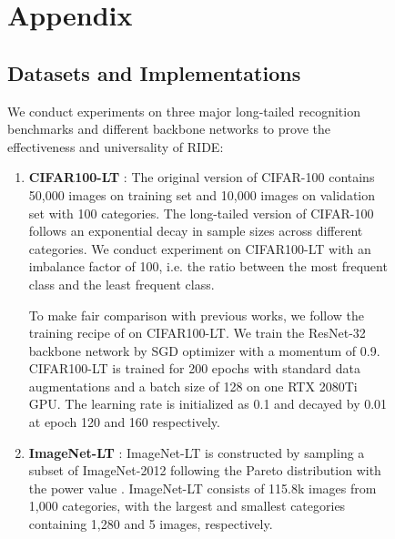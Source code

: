 \documentclass[dvipsnames]{article}
\begin{document}
{\begin{figure}[#1]
\def\figBranchesEnsembles#1{
\begin{figure}[#1]
    \begin{minipage}[t]{0.5\textwidth}
        \vspace{0pt}
        \texttt{[image: figures/branches\_ensembles.pdf]}\vspace{-4pt}
    \end{minipage}\hfill
    \begin{minipage}[t]{0.48\textwidth}
        \vspace{20pt}
        \caption{Comparison between our method and multiple LDAM models ensembled together. In the figure, ensembles of LDAM start from 1 ensemble (original LDAM) to 7 ensembles, and RIDE starts from 2 experts to 4 experts. Our method achieves higher accuracy with substantially less computational cost compared to ensemble method.}
        \label{fig:branches_ensembles}\vspace{-6pt}
    \end{minipage}\vspace{-14pt}
\end{figure}
}

\section{Appendix}
\subsection{Datasets and Implementations}

We conduct experiments on three major long-tailed recognition benchmarks and different backbone networks to prove the effectiveness and universality of RIDE:
\begin{enumerate}[leftmargin=0cm,labelwidth=\itemindent,labelsep=0cm,align=left]
\item {\bf{CIFAR100-LT}} \citep{Krizhevsky09learningmultiple,cao2019learning}: The original version of CIFAR-100 contains 50,000 images on training set and 10,000 images on validation set with 100 categories. The long-tailed version of CIFAR-100 follows an exponential decay in sample sizes across different categories. We conduct experiment on CIFAR100-LT with an imbalance factor of 100, i.e. the ratio between the most frequent class and the least frequent class.

To make fair comparison with previous works, we follow the training recipe of
\citep{cao2019learning} on CIFAR100-LT. We train the ResNet-32 \citep{he2016deep} backbone network by SGD optimizer with a momentum of 0.9. CIFAR100-LT is trained for 200 epochs with standard data augmentations \citep{he2016deep} and a batch size of 128 on one RTX 2080Ti GPU. The learning rate is initialized as 0.1 and decayed by 0.01 at epoch 120 and 160 respectively.
\item {\bf{ImageNet-LT}} \citep{deng2009imagenet,liu2019large}: ImageNet-LT is constructed by sampling a subset of ImageNet-2012 following the Pareto distribution with the power value  \citep{liu2019large}. ImageNet-LT consists of 115.8k images from 1,000 categories, with the largest and smallest categories containing 1,280 and 5 images, respectively.


\end{enumerate}
\end{figure}}
\end{document}
